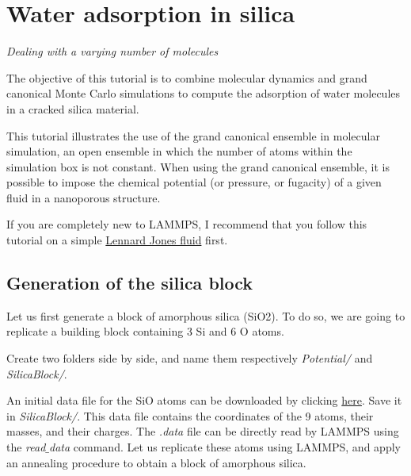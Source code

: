 \chapter{Water adsorption in silica}
\label{gcmc-silica-label}

\noindent \vspace{-1cm} \noindent \textcolor{graytitle}{\textit{{\Large Dealing with a varying number of molecules}}\vspace{0.5cm} }

\vspace{0.25cm} \noindent The objective of this tutorial is to combine molecular
dynamics and grand canonical Monte Carlo simulations to
compute the adsorption of water molecules in a cracked silica material.

\vspace{0.25cm} \noindent This tutorial illustrates the use of the grand canonical
ensemble in molecular simulation, an open ensemble in which
the number of atoms within the simulation box is not constant.
When using the grand canonical ensemble, it is possible to impose
the chemical potential (or pressure, or fugacity) of a given fluid
in a nanoporous structure.

\vspace{0.25cm} \noindent If you are completely new to LAMMPS, I recommend that
you follow this tutorial on a simple \hyperref[lennard-jones-label]{Lennard Jones fluid} first.

\section{Generation of the silica block}
\noindent Let us first generate a block of amorphous silica (SiO2). To do
so, we are going to replicate a building block containing 3
Si and 6 O atoms. 

\vspace{0.25cm} \noindent Create two folders side by side, and name them respectively \textit{Potential/}
and \textit{SilicaBlock/}.

\vspace{0.25cm} \noindent An initial data file for the SiO atoms can be
downloaded by clicking \href{https://lammpstutorials.github.io/lammpstutorials-inputs/level3/water-adsorption-in-silica/SilicaBlock/SiO.data}{here}.
Save it in \textit{SilicaBlock/}. This data file
contains the coordinates of the 9 atoms, their masses, and
their charges. The \textit{.data} file can be directly read by LAMMPS using the
\textit{read$\_$data} command. Let us replicate these atoms using
LAMMPS, and apply an annealing procedure to obtain a block
of amorphous silica.

